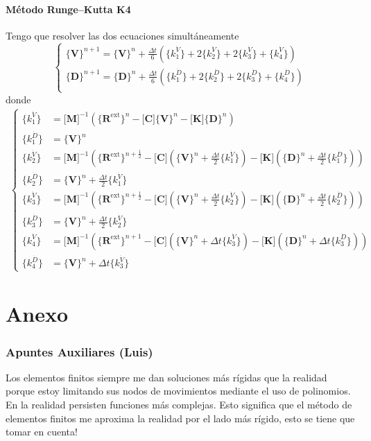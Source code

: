 \documentclass[11pt, a4paper,titlepage]{article}
\newcommand{\Mme}[1]{\boldsymbol{[}\mathbf{#1} \boldsymbol{]}}
\newcommand{\Cme}[1]{\boldsymbol{\{ }\mathbf{#1} \boldsymbol{\}} }
\newcommand{\Cmen}[1]{\boldsymbol{\{ }#1 \boldsymbol{\}} }
\newcommand{\kuD}{\Cmen{k_1^{\dot{D}}}}
\newcommand{\kdD}{\Cmen{k_2^{\dot{D}}}}
\newcommand{\ktD}{\Cmen{k_3^{\dot{D}}}}
\newcommand{\kcD}{\Cmen{k_4^{\dot{D}}}}
\newcommand{\kuV}{\Cmen{k_1^{\dot{V}}}}
\newcommand{\kdV}{\Cmen{k_2^{\dot{V}}}}
\newcommand{\ktV}{\Cmen{k_3^{\dot{V}}}}
\newcommand{\kcV}{\Cmen{k_4^{\dot{V}}}}
\newcommand{\MK}{\Mme{K}}
\newcommand{\MC}{\Mme{C}}
\begin{document}
\subsection*{Método Runge--Kutta K4}
Tengo que resolver las dos ecuaciones simultáneamente
\[
\begin{cases}
	\Cme{V}^{n+1}=\Cme{V}^n + \frac{\Delta t}{6} \left( \kuV + 2\kdV + 2\ktV + \kcV \right) \\
	\Cme{D}^{n+1}=\Cme{D}^n + \frac{\Delta t}{6} \left( \kuD + 2\kdD + 2\ktD + \kcD \right) \\
\end{cases}
\]
donde 
\begin{align*}
	\begin{cases}
	\kuV &= \Mme{M}^{-1} \left( \Cme{R^{\mathrm{ext}}}^n - \MC \Cme{V}^n - \MK \Cme{D}^n  \right) \\
	\kuD &= \Cme{V}^n \\\hline
	\kdV &= \Mme{M}^{-1} \left( \Cme{R^{\mathrm{ext}}}^{n+\frac{1}{2}} - \MC \left(\Cme{V}^n + \frac{\Delta t}{2} \kuV \right) - \MK \left( \Cme{D}^n + \frac{\Delta t}{2} \kuD \right)  \right) \\
	\kdD &= \Cme{V}^n + \frac{\Delta t}{2} \kuV \\	\hline
	\ktV &= \Mme{M}^{-1} \left( \Cme{R^{\mathrm{ext}}}^{n+\frac{1}{2}} - \MC \left(\Cme{V}^n + \frac{\Delta t}{2} \kdV \right) - \MK \left( \Cme{D}^n + \frac{\Delta t}{2} \kdD \right)  \right) \\
	\ktD &= \Cme{V}^n + \frac{\Delta t}{2} \kdV \\	\hline
	\kcV &= \Mme{M}^{-1} \left( \Cme{R^{\mathrm{ext}}}^{n+1} - \MC \left(\Cme{V}^n + \Delta t \ktV \right) - \MK \left( \Cme{D}^n + \Delta t \ktD \right)  \right) \\
	\kcD &= \Cme{V}^n + \Delta t \ktV
	\end{cases}
\end{align*}


\part{Anexo}

\section*{Apuntes Auxiliares (Luis)}
Los elementos finitos siempre me dan soluciones más rígidas que la realidad porque estoy limitando sus nodos de movimientos mediante el uso de polinomios. En la realidad persisten funciones más complejas. Esto significa que el método de elementos finitos me aproxima la realidad por el lado más rígido, esto se tiene que tomar en cuenta!
\end{document}
